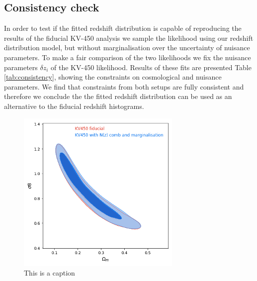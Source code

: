 \documentclass{aa}
\begin{document}
\subsection{Consistency check}
In order to test if the fitted redshift distribution is capable of reproducing the results of the fiducial KV-450 analysis we sample the likelihood using our redshift distribution model, but without marginalisation over the uncertainty of nuisance parameters. To make a fair comparison of the two likelihoods we fix the nuisance parameters $\delta z_i$ of the KV-450 likelihood. Results of these fits are presented Table \ref{tab:consistency}, showing the constraints on cosmological and nuisance parameters. We find that constraints from both setups are fully consistent and therefore we conclude the the fitted redshift distribution can be used as an alternative to the fiducial redshift histograms.

\begin{figure}
\centering
\includegraphics[scale=0.5]{plots/Om_s8.png}
\caption{{\color{red} This is a caption}}
\label{fig:Om_s8_consistency}
\end{figure}
\end{document}
